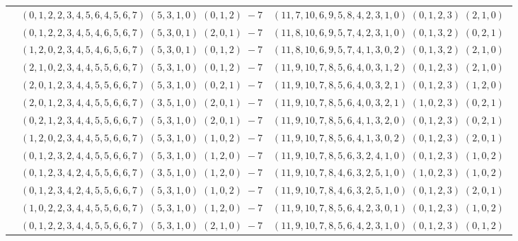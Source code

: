 \documentclass[11pt]{article}
\begin{document}
\begin{longtable}[l]{|c|c|c|}
 \cline{2-3} 
 & $(0 ,1 ,2 ,2 ,3 ,4 ,5 ,6 ,4 ,5 ,6 ,7) \;(5 ,3 ,1 ,0) \;(0 ,1 ,2) \;-7$ & $(11 ,7 ,10 ,6 ,9 ,5 ,8 ,4 ,2 ,3 ,1 ,0) \;(0 ,1 ,2 ,3) \;(2 ,1 ,0) \;$\\ 
 \cline{2-3} 
 & $(0 ,1 ,2 ,2 ,3 ,4 ,5 ,4 ,6 ,5 ,6 ,7) \;(5 ,3 ,0 ,1) \;(2 ,0 ,1) \;-7$ & $(11 ,8 ,10 ,6 ,9 ,5 ,7 ,4 ,2 ,3 ,1 ,0) \;(0 ,1 ,3 ,2) \;(0 ,2 ,1) \;$\\ 
 \cline{2-3} 
 & $(1 ,2 ,0 ,2 ,3 ,4 ,5 ,4 ,6 ,5 ,6 ,7) \;(5 ,3 ,0 ,1) \;(0 ,1 ,2) \;-7$ & $(11 ,8 ,10 ,6 ,9 ,5 ,7 ,4 ,1 ,3 ,0 ,2) \;(0 ,1 ,3 ,2) \;(2 ,1 ,0) \;$\\ 
 \cline{2-3} 
 & $(2 ,1 ,0 ,2 ,3 ,4 ,4 ,5 ,5 ,6 ,6 ,7) \;(5 ,3 ,1 ,0) \;(0 ,1 ,2) \;-7$ & $(11 ,9 ,10 ,7 ,8 ,5 ,6 ,4 ,0 ,3 ,1 ,2) \;(0 ,1 ,2 ,3) \;(2 ,1 ,0) \;$\\ 
 \cline{2-3} 
 & $(2 ,0 ,1 ,2 ,3 ,4 ,4 ,5 ,5 ,6 ,6 ,7) \;(5 ,3 ,1 ,0) \;(0 ,2 ,1) \;-7$ & $(11 ,9 ,10 ,7 ,8 ,5 ,6 ,4 ,0 ,3 ,2 ,1) \;(0 ,1 ,2 ,3) \;(1 ,2 ,0) \;$\\ 
 \cline{2-3} 
 & $(2 ,0 ,1 ,2 ,3 ,4 ,4 ,5 ,5 ,6 ,6 ,7) \;(3 ,5 ,1 ,0) \;(2 ,0 ,1) \;-7$ & $(11 ,9 ,10 ,7 ,8 ,5 ,6 ,4 ,0 ,3 ,2 ,1) \;(1 ,0 ,2 ,3) \;(0 ,2 ,1) \;$\\ 
 \cline{2-3} 
 & $(0 ,2 ,1 ,2 ,3 ,4 ,4 ,5 ,5 ,6 ,6 ,7) \;(5 ,3 ,1 ,0) \;(2 ,0 ,1) \;-7$ & $(11 ,9 ,10 ,7 ,8 ,5 ,6 ,4 ,1 ,3 ,2 ,0) \;(0 ,1 ,2 ,3) \;(0 ,2 ,1) \;$\\ 
 \cline{2-3} 
 & $(1 ,2 ,0 ,2 ,3 ,4 ,4 ,5 ,5 ,6 ,6 ,7) \;(5 ,3 ,1 ,0) \;(1 ,0 ,2) \;-7$ & $(11 ,9 ,10 ,7 ,8 ,5 ,6 ,4 ,1 ,3 ,0 ,2) \;(0 ,1 ,2 ,3) \;(2 ,0 ,1) \;$\\ 
 \cline{2-3} 
 & $(0 ,1 ,2 ,3 ,2 ,4 ,4 ,5 ,5 ,6 ,6 ,7) \;(5 ,3 ,1 ,0) \;(1 ,2 ,0) \;-7$ & $(11 ,9 ,10 ,7 ,8 ,5 ,6 ,3 ,2 ,4 ,1 ,0) \;(0 ,1 ,2 ,3) \;(1 ,0 ,2) \;$\\ 
 \cline{2-3} 
 & $(0 ,1 ,2 ,3 ,4 ,2 ,4 ,5 ,5 ,6 ,6 ,7) \;(3 ,5 ,1 ,0) \;(1 ,2 ,0) \;-7$ & $(11 ,9 ,10 ,7 ,8 ,4 ,6 ,3 ,2 ,5 ,1 ,0) \;(1 ,0 ,2 ,3) \;(1 ,0 ,2) \;$\\ 
 \cline{2-3} 
 & $(0 ,1 ,2 ,3 ,4 ,2 ,4 ,5 ,5 ,6 ,6 ,7) \;(5 ,3 ,1 ,0) \;(1 ,0 ,2) \;-7$ & $(11 ,9 ,10 ,7 ,8 ,4 ,6 ,3 ,2 ,5 ,1 ,0) \;(0 ,1 ,2 ,3) \;(2 ,0 ,1) \;$\\ 
 \cline{2-3} 
 & $(1 ,0 ,2 ,2 ,3 ,4 ,4 ,5 ,5 ,6 ,6 ,7) \;(5 ,3 ,1 ,0) \;(1 ,2 ,0) \;-7$ & $(11 ,9 ,10 ,7 ,8 ,5 ,6 ,4 ,2 ,3 ,0 ,1) \;(0 ,1 ,2 ,3) \;(1 ,0 ,2) \;$\\ 
 \cline{2-3} 
 & $(0 ,1 ,2 ,2 ,3 ,4 ,4 ,5 ,5 ,6 ,6 ,7) \;(5 ,3 ,1 ,0) \;(2 ,1 ,0) \;-7$ & $(11 ,9 ,10 ,7 ,8 ,5 ,6 ,4 ,2 ,3 ,1 ,0) \;(0 ,1 ,2 ,3) \;(0 ,1 ,2) \;$\\ 

\end{longtable}
\end{document}
